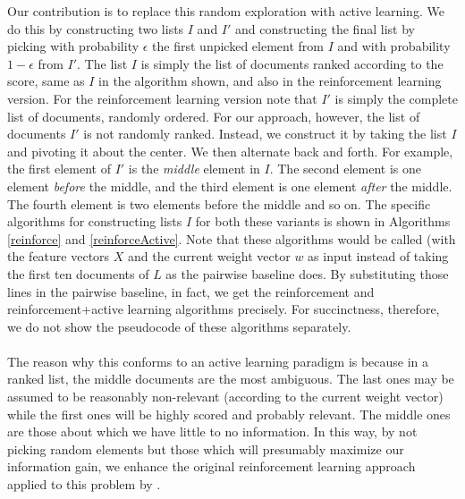 \documentclass{acm_proc_article-sp}
\begin{document}
Our contribution is to replace this random exploration with active learning. We do this by constructing two lists $I$ and $I'$ and constructing the final list by picking with probability $\epsilon$ the first unpicked element from $I$ and with probability $1-\epsilon$ from $I'$. The list $I$ is simply the list of documents ranked according to the score, same as $I$ in the algorithm shown, and also in the reinforcement learning version. For the reinforcement learning version note that $I'$ is simply the complete list of documents, randomly ordered. For our approach, however, the list of documents $I'$ is not randomly ranked. Instead, we construct it by taking the list $I$ and pivoting it about the center. We then alternate back and forth. For example, the first element of $I'$ is the \emph{middle} element in $I$. The second element is one element \emph{before} the middle, and the third element is one element \emph{after} the middle. The fourth element is two elements before the middle and so on. The specific algorithms for constructing lists $I$ for both these variants is shown in Algorithms \ref{reinforce} and \ref{reinforceActive}. Note that these algorithms would be called (with the feature vectors $X$ and the current weight vector $w$ as input instead of taking the first ten documents of $L$ as the pairwise baseline does. By substituting those lines in the pairwise baseline, in fact, we get the reinforcement and reinforcement+active learning algorithms precisely. For succinctness, therefore, we do not show the pseudocode of these algorithms separately.  \\ \\
The reason why this conforms to an active learning paradigm is because in a ranked list, the middle documents are the most ambiguous. The last ones may be assumed to be reasonably non-relevant (according to the current weight vector) while the first ones will be highly scored and probably relevant. The middle ones are those about which we have little to no information. In this way, by not picking random elements but those which will presumably maximize our information gain, we enhance the original reinforcement learning approach applied to this problem by \cite{hofmann}.  
\end{document}
